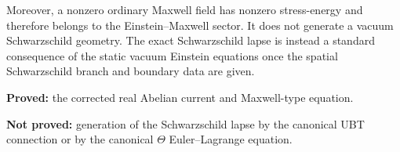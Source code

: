 \documentclass[12pt,a4paper]{article}
\theoremstyle{remark}\newtheorem{remark}[theorem]{Remark}
\begin{document}
Moreover, a nonzero ordinary Maxwell field has nonzero stress-energy and
therefore belongs to the Einstein--Maxwell sector.  It does not generate a
vacuum Schwarzschild geometry.  The exact Schwarzschild lapse is instead a
standard consequence of the static vacuum Einstein equations once the spatial
Schwarzschild branch and boundary data are given.

\begin{resultbox}
\textbf{Proved:} the corrected real Abelian current and Maxwell-type equation.
\end{resultbox}
\begin{gapbox}
\textbf{Not proved:} generation of the Schwarzschild lapse by the canonical
UBT connection or by the canonical $\Theta$ Euler--Lagrange equation.
\end{gapbox}

\ifdefined\INCLUDEMODE\else
\end{document}
